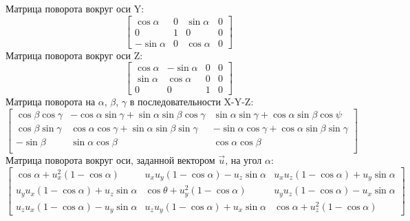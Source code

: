 \documentclass[a4paper,12pt]{report}
\numberwithin{equation}{section}
\begin{document}
Матрица поворота вокруг оси Y:
\begin{equation}
\begin{bmatrix}
\cos{\alpha} & 0 & \sin{\alpha} & 0 \\
0 & 1 & 0 & 0 \\
- \sin{\alpha} & 0 & \cos{\alpha} & 0
\end{bmatrix}
\end{equation}
Матрица поворота вокруг оси Z:
\begin{equation}
\begin{bmatrix}
\cos{\alpha} & -\sin{\alpha} & 0 & 0 \\
\sin{\alpha} & \cos{\alpha} & 0 & 0 \\
0 & 0 & 1 & 0
\end{bmatrix}
\end{equation}
Матрица поворота на $\alpha$, $\beta$, $\gamma$ в последовательности X-Y-Z:
\begin{equation}
\begin{bmatrix}
\cos\beta \cos\gamma & -\cos\alpha \sin\gamma + \sin\alpha \sin\beta \cos\gamma &   \sin\alpha \sin\gamma + \cos\alpha \sin\beta \cos\psi \\
\cos\beta \sin\gamma &  \cos\alpha \cos\gamma + \sin\alpha \sin\beta \sin\gamma & -\sin\alpha \cos\gamma + \cos\alpha \sin\beta \sin\gamma \\
-\sin\beta &  \sin\alpha \cos\beta & \cos\alpha \cos\beta \\
\end{bmatrix}
\end{equation}
Матрица поворота вокруг оси, заданной вектором $\vec{u}$, на угол $\alpha$:
\begin{equation}
\begin{bmatrix}
\cos \alpha +u_x^2 \left(1-\cos \alpha\right) & u_x u_y \left(1-\cos \alpha\right) - u_z \sin \alpha & u_x u_z \left(1-\cos \alpha\right) + u_y \sin \alpha \\ u_y u_x \left(1-\cos \alpha\right) + u_z \sin \alpha & \cos \theta + u_y^2\left(1-\cos \alpha\right) & u_y u_z \left(1-\cos \alpha\right) - u_x \sin \alpha \\ u_z u_x \left(1-\cos \alpha\right) - u_y \sin \alpha & u_z u_y \left(1-\cos \alpha\right) + u_x \sin \alpha & \cos \alpha + u_z^2\left(1-\cos \alpha\right) 
\end{bmatrix}
\end{equation}
\end{document}
